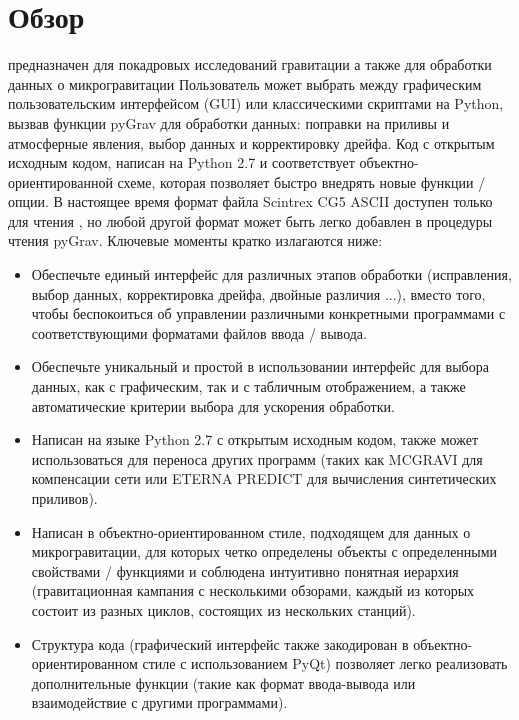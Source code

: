 \chapter[Обзор]{Обзор}
\label{overview}

\pg{} \cite{a10-063_new_instrument_data_report} предназначен для покадровых исследований
гравитации а также для обработки данных о микрогравитации Пользователь может
выбрать между графическим пользовательским интерфейсом (GUI) или классическими
скриптами на Python, вызвав функции pyGrav для обработки данных: поправки на
приливы и атмосферные явления, выбор данных и корректировку дрейфа. Код с
открытым исходным кодом, написан на Python 2.7 и соответствует
объектно-ориентированной схеме, которая позволяет быстро внедрять новые функции
/ опции. В настоящее время формат файла Scintrex CG5 ASCII доступен только для
чтения , но любой другой формат может быть легко добавлен в процедуры чтения
pyGrav. Ключевые моменты кратко излагаются ниже:
\begin{itemize}
    \item Обеспечьте единый интерфейс для различных этапов обработки
    (исправления, выбор данных, корректировка дрейфа, двойные различия ...),
    вместо того, чтобы беспокоиться об управлении различными конкретными
    программами с соответствующими форматами файлов ввода / вывода.
    
    \item Обеспечьте уникальный и простой в использовании интерфейс для выбора
    данных, как с графическим, так и с табличным отображением, а также
    автоматические критерии выбора для ускорения обработки.
    
    \item Написан на языке Python 2.7 с открытым исходным кодом, также может
    использоваться для переноса других программ (таких как MCGRAVI для
    компенсации сети или ETERNA PREDICT для вычисления синтетических приливов).
    
    \item Написан в объектно-ориентированном стиле, подходящем для данных о
    микрогравитации, для которых четко определены объекты с определенными
    свойствами / функциями и соблюдена интуитивно понятная иерархия
    (гравитационная кампания с несколькими обзорами, каждый из которых состоит
    из разных циклов, состоящих из нескольких станций).
    
    \item Структура кода (графический интерфейс также закодирован в
    объектно-ориентированном стиле с использованием PyQt) позволяет легко
    реализовать дополнительные функции (такие как формат ввода-вывода или
    взаимодействие с другими программами).

\end{itemize}